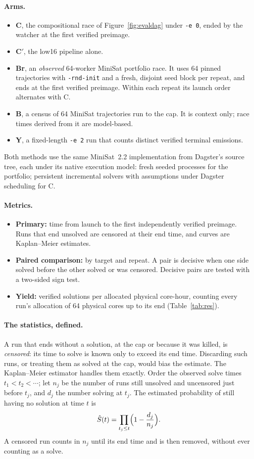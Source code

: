 \documentclass[11pt,a4paper]{article}
\newcommand{\flag}[1]{\texttt{#1}}
\begin{document}
\paragraph{Arms.}
\begin{itemize}
\item \textbf{C}, the compositional race of Figure~\ref{fig:evaldag} under \flag{-e 0}, ended by the
watcher at the first verified preimage.
\item \textbf{C$'$}, the low16 pipeline alone.
\item \textbf{Br}, an \emph{observed} 64-worker MiniSat portfolio race. It uses 64 pinned
trajectories with \flag{-rnd-init} and a fresh, disjoint seed block per repeat, and ends at the first
verified preimage. Within each repeat its launch order alternates with C.
\item \textbf{B}, a census of 64 MiniSat trajectories run to the cap. It is context only; race times
derived from it are model-based.
\item \textbf{Y}, a fixed-length \flag{-e 2} run that counts distinct verified terminal emissions.
\end{itemize}
Both methods use the same MiniSat~2.2 implementation from Dagster's source tree, each under its
native execution model: fresh seeded processes for the portfolio; persistent incremental solvers
with assumptions under Dagster scheduling for C.

\paragraph{Metrics.}
\begin{itemize}
\item \textbf{Primary:} time from launch to the first independently verified preimage. Runs that
end unsolved are censored at their end time, and curves are Kaplan--Meier estimates.
\item \textbf{Paired comparison:} by target and repeat. A pair is decisive when one side solved before
the other solved or was censored. Decisive pairs are tested with a two-sided sign test.
\item \textbf{Yield:} verified solutions per allocated physical core-hour, counting every run's
allocation of 64 physical cores up to its end (Table~\ref{tab:res}).
\end{itemize}

\paragraph{The statistics, defined.} A run that ends without a solution, at the cap or because it was
killed, is \emph{censored}: its time to solve is known only to exceed its end time. Discarding such
runs, or treating them as solved at the cap, would bias the estimate. The Kaplan--Meier estimator
handles them exactly. Order the observed solve times $t_1<t_2<\cdots$; let $n_j$ be the number of runs
still unsolved and uncensored just before $t_j$, and $d_j$ the number solving at $t_j$. The estimated
probability of still having no solution at time $t$ is
\[
\hat S(t)=\prod_{t_j\le t}\Bigl(1-\frac{d_j}{n_j}\Bigr).
\]
A censored run counts in $n_j$ until its end time and is then removed, without ever counting as a
solve.
\end{document}
